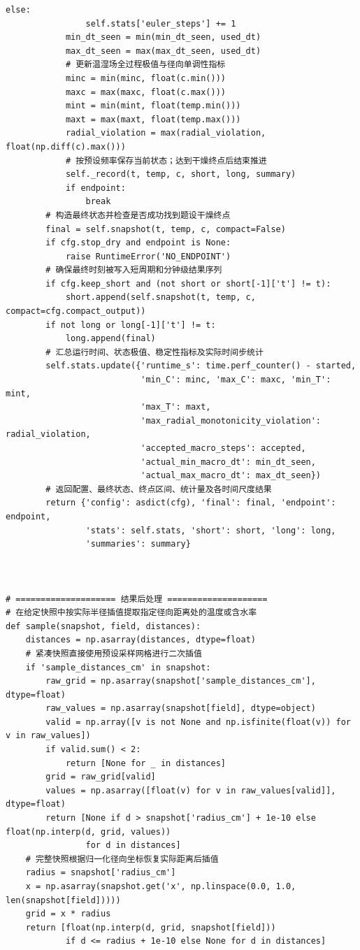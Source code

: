 \begin{Verbatim}[fontsize=\scriptsize,breaklines=true,breakanywhere=true]
            else:
                self.stats['euler_steps'] += 1
            min_dt_seen = min(min_dt_seen, used_dt)
            max_dt_seen = max(max_dt_seen, used_dt)
            # 更新温湿场全过程极值与径向单调性指标
            minc = min(minc, float(c.min()))
            maxc = max(maxc, float(c.max()))
            mint = min(mint, float(temp.min()))
            maxt = max(maxt, float(temp.max()))
            radial_violation = max(radial_violation, float(np.diff(c).max()))
            # 按预设频率保存当前状态；达到干燥终点后结束推进
            self._record(t, temp, c, short, long, summary)
            if endpoint:
                break
        # 构造最终状态并检查是否成功找到题设干燥终点
        final = self.snapshot(t, temp, c, compact=False)
        if cfg.stop_dry and endpoint is None:
            raise RuntimeError('NO_ENDPOINT')
        # 确保最终时刻被写入短周期和分钟级结果序列
        if cfg.keep_short and (not short or short[-1]['t'] != t):
            short.append(self.snapshot(t, temp, c, compact=cfg.compact_output))
        if not long or long[-1]['t'] != t:
            long.append(final)
        # 汇总运行时间、状态极值、稳定性指标及实际时间步统计
        self.stats.update({'runtime_s': time.perf_counter() - started,
                           'min_C': minc, 'max_C': maxc, 'min_T': mint,
                           'max_T': maxt,
                           'max_radial_monotonicity_violation': radial_violation,
                           'accepted_macro_steps': accepted,
                           'actual_min_macro_dt': min_dt_seen,
                           'actual_max_macro_dt': max_dt_seen})
        # 返回配置、最终状态、终点区间、统计量及各时间尺度结果
        return {'config': asdict(cfg), 'final': final, 'endpoint': endpoint,
                'stats': self.stats, 'short': short, 'long': long,
                'summaries': summary}



# ==================== 结果后处理 ====================
# 在给定快照中按实际半径插值提取指定径向距离处的温度或含水率
def sample(snapshot, field, distances):
    distances = np.asarray(distances, dtype=float)
    # 紧凑快照直接使用预设采样网格进行二次插值
    if 'sample_distances_cm' in snapshot:
        raw_grid = np.asarray(snapshot['sample_distances_cm'], dtype=float)
        raw_values = np.asarray(snapshot[field], dtype=object)
        valid = np.array([v is not None and np.isfinite(float(v)) for v in raw_values])
        if valid.sum() < 2:
            return [None for _ in distances]
        grid = raw_grid[valid]
        values = np.asarray([float(v) for v in raw_values[valid]], dtype=float)
        return [None if d > snapshot['radius_cm'] + 1e-10 else float(np.interp(d, grid, values))
                for d in distances]
    # 完整快照根据归一化径向坐标恢复实际距离后插值
    radius = snapshot['radius_cm']
    x = np.asarray(snapshot.get('x', np.linspace(0.0, 1.0, len(snapshot[field]))))
    grid = x * radius
    return [float(np.interp(d, grid, snapshot[field]))
            if d <= radius + 1e-10 else None for d in distances]
\end{Verbatim}

